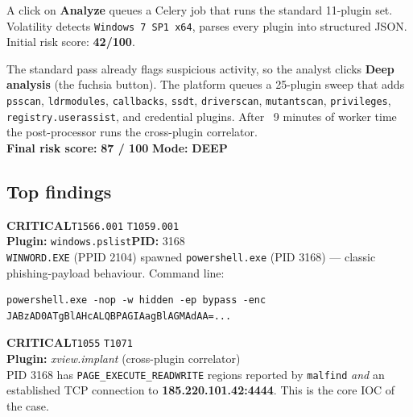 \documentclass[11pt,a4paper]{article}
\providecommand{\faExclamationTriangle}{!}%
\newcommand{\sev}[1]{%
  \ifstrequal{#1}{critical}{\colorbox{sevcrit}{\color{white}\textbf{\footnotesize CRITICAL}}}{%
  \ifstrequal{#1}{high}{\colorbox{sevhigh}{\color{white}\textbf{\footnotesize HIGH}}}{%
  \ifstrequal{#1}{medium}{\colorbox{sevmed}{\color{black}\textbf{\footnotesize MEDIUM}}}{%
  \ifstrequal{#1}{low}{\colorbox{sevlow}{\color{black}\textbf{\footnotesize LOW}}}{%
  \colorbox{slate}{\color{white}\textbf{\footnotesize INFO}}}}}}}
\newcommand{\mitre}[1]{\colorbox{accent!25}{\textcolor{ink}{\texttt{\footnotesize #1}}}}
\begin{document}
\begin{stepbox}
A click on \textbf{Analyze} queues a Celery job that runs the standard
11-plugin set. Volatility detects \texttt{Windows~7~SP1~x64}, parses every
plugin into structured JSON. Initial risk score: \textbf{42/100}.
\end{stepbox}

\begin{stepbox}
The standard pass already flags suspicious activity, so the analyst clicks
\textbf{Deep analysis} (the fuchsia button). The platform queues a 25-plugin
sweep that adds \texttt{psscan}, \texttt{ldrmodules}, \texttt{callbacks},
\texttt{ssdt}, \texttt{driverscan}, \texttt{mutantscan}, \texttt{privileges},
\texttt{registry.userassist}, and credential plugins. After ~9 minutes of
worker time the post-processor runs the cross-plugin correlator.\\[4pt]
\textbf{Final risk score:} \colorbox{sevcrit}{\color{white}\textbf{ 87 / 100 }}\quad
\textbf{Mode:} \colorbox{accent2}{\color{white}\textbf{ DEEP }}
\end{stepbox}

\subsection{Top findings}

\begin{tcolorbox}[enhanced, breakable, colback=ink2!5, colframe=sevcrit,
                  boxrule=0.6pt, arc=2pt, left=8pt, right=8pt,
                  title={\bfseries \faExclamationTriangle\ Finding 1 — Office spawned a shell},
                  coltitle=white, colbacktitle=sevcrit]
\sev{critical}\quad \mitre{T1566.001} \mitre{T1059.001}\\[4pt]
\textbf{Plugin:} \texttt{windows.pslist}\quad \textbf{PID:} 3168\\
\texttt{WINWORD.EXE} (PPID 2104) spawned \texttt{powershell.exe} (PID 3168) —
classic phishing-payload behaviour. Command line:
\begin{lstlisting}
powershell.exe -nop -w hidden -ep bypass -enc JABzAD0ATgBlAHcALQBPAGIAagBlAGMAdAA=...
\end{lstlisting}
\end{tcolorbox}

\begin{tcolorbox}[enhanced, breakable, colback=ink2!5, colframe=sevcrit,
                  boxrule=0.6pt, arc=2pt, left=8pt, right=8pt,
                  title={\bfseries \faExclamationTriangle\ Finding 2 — Injected process beaconing},
                  coltitle=white, colbacktitle=sevcrit]
\sev{critical}\quad \mitre{T1055} \mitre{T1071}\\[4pt]
\textbf{Plugin:} \emph{xview.implant} (cross-plugin correlator)\\
PID 3168 has \texttt{PAGE\_EXECUTE\_READWRITE} regions reported by
\texttt{malfind} \emph{and} an established TCP connection to
\textbf{185.220.101.42:4444}. This is the core IOC of the case.
\end{tcolorbox}
\end{document}
